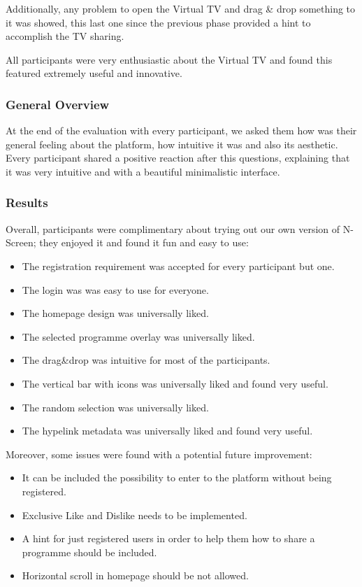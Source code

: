 \documentclass{acm_proc_article-sp}
\begin{document}
Additionally, any problem to open the Virtual TV and drag \& drop something to it was showed, this last one since the previous phase provided a hint to accomplish the TV sharing.

All participants were very enthusiastic about the Virtual TV and found this featured extremely useful and innovative.

\subsubsection{General Overview}

At the end of the evaluation with every participant, we asked them how was their general feeling about the platform, how intuitive it was and also its aesthetic. Every participant shared a positive reaction after this questions, explaining that it was very intuitive and with a beautiful minimalistic interface.  

\subsubsection{Results}

Overall, participants were complimentary about trying out our own version of N-Screen; they enjoyed it and found it fun and easy to use:

\begin{itemize}
	\item The registration requirement was accepted for every participant but one. 
	\item The login was was easy to use for everyone. 
	\item The homepage design was universally liked. 
	\item The selected programme overlay was universally liked. 
	\item The drag\&drop was intuitive for most of the participants. 
	\item The vertical bar with icons was universally liked and found very useful.
	\item The random selection was universally liked.
	\item The hypelink metadata was universally liked and found very useful. 
\end{itemize}

Moreover, some issues were found with a potential future improvement: 

\begin{itemize}
	\item It can be included the possibility to enter to the platform without being registered. 
	\item Exclusive Like and Dislike needs to be implemented. 
	\item A hint for just registered users in order to help them how to share a programme should be included. 
	\item Horizontal scroll in homepage should be not allowed.
\end{itemize}
\end{document}
